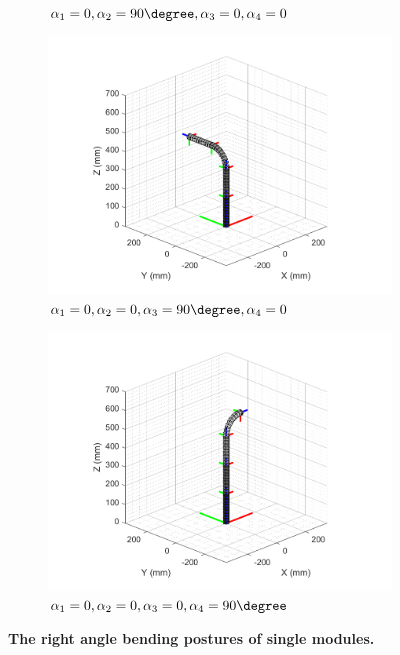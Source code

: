 \begin{figure}[H]
\begin{subfigure}{0.48\textwidth}
        \caption{$\alpha_1=0,\alpha_2=90 \degree,\alpha_3=0,\alpha_4=0$}
    \end{subfigure}
    \begin{subfigure}{0.48\textwidth} %
        \centering
        \includegraphics[width=\linewidth]{Image/MATLAB/manipulator_0_0_90_0.png}
        \caption{$\alpha_1=0,\alpha_2=0,\alpha_3=90 \degree,\alpha_4=0$}
    \end{subfigure}
    \hfill
    \begin{subfigure}{0.48\textwidth}
        \centering
        \includegraphics[width=\linewidth]{Image/MATLAB/manipulator_0_0_0_90.png}
        \caption{$\alpha_1=0,\alpha_2=0,\alpha_3=0,\alpha_4=90 \degree$}
    \end{subfigure}
    \caption[The right angle bending postures of single modules]
    {\centering \textbf{The right angle bending postures of single modules.}}
    \label{fig:kinematics_model_resp}
\end{figure}
